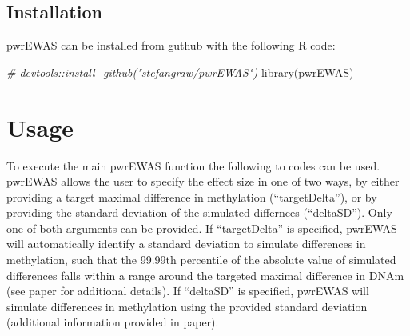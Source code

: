 \documentclass[]{article}
\newcommand{\hlcom}[1]{\textcolor[rgb]{0.502,0.502,0.502}{\textit{#1}}}%
\newcommand{\hlstd}[1]{\textcolor[rgb]{0.251,0.251,0.251}{#1}}%
\newcommand{\hlkwd}[1]{\textcolor[rgb]{0.878,0.439,0.125}{#1}}%
\newenvironment{Shaded}{\begin{myshaded}}{\end{myshaded}}
\newcommand{\KeywordTok}[1]{\hlkwd{#1}}
\newcommand{\CommentTok}[1]{\hlcom{#1}}
\newcommand{\NormalTok}[1]{\hlstd{#1}}
\begin{document}
\subsection{Installation}\label{installation}

pwrEWAS can be installed from guthub with the following R code:

\begin{Shaded}
\begin{Highlighting}[]
\CommentTok{# devtools::install_github("stefangraw/pwrEWAS")}
\KeywordTok{library}\NormalTok{(pwrEWAS)}
\end{Highlighting}
\end{Shaded}

\newpage

\section{Usage}\label{usage}

To execute the main pwrEWAS function the following to codes can be used.
pwrEWAS allows the user to specify the effect size in one of two ways,
by either providing a target maximal difference in methylation
(``targetDelta''), or by providing the standard deviation of the
simulated differnces (``deltaSD''). Only one of both arguments can be
provided. If ``targetDelta'' is specified, pwrEWAS will automatically
identify a standard deviation to simulate differences in methylation,
such that the 99.99th percentile of the absolute value of simulated
differences falls within a range around the targeted maximal difference
in DNAm (see paper for additional details). If ``deltaSD'' is specified,
pwrEWAS will simulate differences in methylation using the provided
standard deviation (additional information provided in paper).
\end{document}
